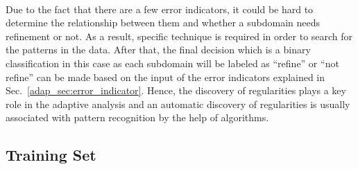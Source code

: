 \paragraph{}
Due to the fact that there are a few error indicators, it could be hard to determine the relationship between them and whether a subdomain needs refinement or not.
As a result, specific technique is required in order to search for the patterns in the data.
After that, the final decision which is a binary classification in this case as each subdomain will be labeled as ``refine'' or ``not refine'' can be made based on the input of the error indicators explained in Sec.~\ref{adap_sec:error_indicator}.
Hence, the discovery of regularities plays a key role in the adaptive analysis and an automatic discovery of regularities is usually associated with pattern recognition by the help of algorithms.

\subsection{Training Set}
